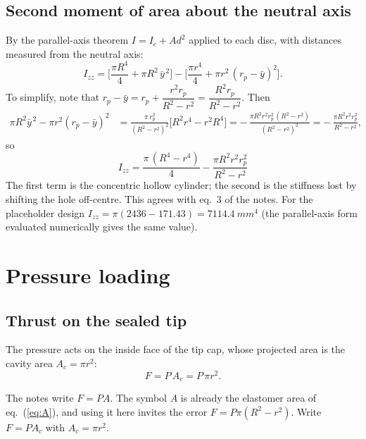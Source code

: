 \documentclass[11pt,a4paper]{article}
\numberwithin{equation}{section}
\newcommand{\Izz}{I_{zz}}
\newcommand{\rp}{r_p}
\begin{document}
\subsection{Second moment of area about the neutral axis}
By the parallel-axis theorem $I = I_c + A d^2$ applied to each disc, with distances measured from the neutral axis:
\begin{equation}
\Izz = \Big[\frac{\pi R^4}{4} + \pi R^2\,\bar y^{\,2}\Big] - \Big[\frac{\pi r^4}{4} + \pi r^2\,(\rp-\bar y)^2\Big].
\end{equation}
To simplify, note that $\rp - \bar y = \rp + \dfrac{r^2\rp}{R^2-r^2} = \dfrac{R^2\rp}{R^2-r^2}$. Then
\begin{align}
\pi R^2\bar y^{\,2} - \pi r^2(\rp-\bar y)^2
&= \frac{\pi\,\rp^2}{(R^2-r^2)^2}\Big[R^2 r^4 - r^2 R^4\Big]
 = -\,\frac{\pi R^2 r^2 \rp^2\,(R^2-r^2)}{(R^2-r^2)^2}
 = -\,\frac{\pi R^2 r^2 \rp^2}{R^2-r^2},
\end{align}
so
\begin{equation}
\boxed{\;\Izz = \frac{\pi\,(R^4-r^4)}{4} - \frac{\pi R^2 r^2 \rp^2}{R^2-r^2}\;} \label{eq:I}
\end{equation}
The first term is the concentric hollow cylinder; the second is the stiffness lost by shifting the hole off-centre.
This agrees with eq.~3 of the notes. For the placeholder design $\Izz = \pi(2436 - 171.43) = \SI{7114.4}{mm^4}$
(the parallel-axis form evaluated numerically gives the same value).

\section{Pressure loading}\label{sec:load}

\subsection{Thrust on the sealed tip}
The pressure acts on the inside face of the tip cap, whose projected area is the cavity area $A_c = \pi r^2$:
\begin{equation}
F = P\,A_c = P\,\pi r^2 . \label{eq:F}
\end{equation}

\begin{correction}
The notes write $F = PA$. The symbol $A$ is already the elastomer area of eq.~(\ref{eq:A}), and using it here
invites the error $F = P\pi(R^2-r^2)$. Write $F = P A_c$ with $A_c=\pi r^2$.
\end{correction}
\end{document}
